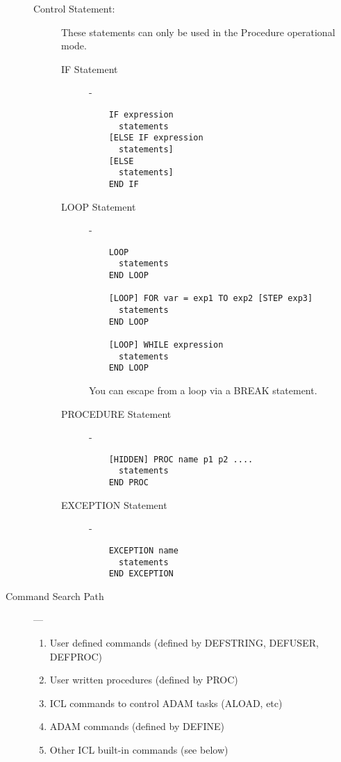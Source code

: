 \begin{description}
\begin{description}
\item [Control Statement:] \mbox{}

These statements can only be used in the Procedure operational mode.
\begin{description}

\item [IF Statement] -

\begin{verbatim}
    IF expression
      statements
    [ELSE IF expression
      statements]
    [ELSE
      statements]
    END IF
\end{verbatim}

\item [LOOP Statement] -

\begin{verbatim}
    LOOP
      statements
    END LOOP

    [LOOP] FOR var = exp1 TO exp2 [STEP exp3]
      statements
    END LOOP

    [LOOP] WHILE expression
      statements
    END LOOP
\end{verbatim}
You can escape from a loop via a BREAK statement.

\newpage

\item [PROCEDURE Statement] -

\begin{verbatim}
    [HIDDEN] PROC name p1 p2 ....
      statements
    END PROC
\end{verbatim}

\item [EXCEPTION Statement] -

\begin{verbatim}
    EXCEPTION name
      statements
    END EXCEPTION
\end{verbatim}

\end{description}
\end{description}

\item [Command Search Path] ---

\begin{enumerate}
\item User defined commands (defined by DEFSTRING, DEFUSER, DEFPROC)
\item User written procedures (defined by PROC)
\item ICL commands to control ADAM tasks (ALOAD, etc)
\item ADAM commands (defined by DEFINE)
\item Other ICL built-in commands (see below)
\end{enumerate}
\end{description}


